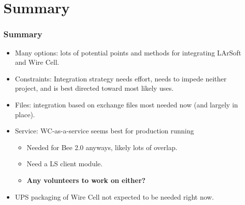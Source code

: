 \documentclass[xcolor=dvipsnames]{beamer}
\begin{document}
\section{Summary}

\begin{frame}
\end{frame}

\begin{frame}
  \frametitle{Summary}
  \begin{itemize}
  \item Many options: lots of potential points and methods for integrating LArSoft and Wire Cell.
  \item Constraints: Integration strategy needs effort, needs
    to impede neither project, and is best directed toward most likely uses.
  \item Files: integration based on exchange files most needed now (and largely in place).
  \item Service: WC-as-a-service seems best for production running
    \begin{itemize}
    \item Needed for Bee 2.0 anyways, likely lots of overlap.
    \item Need a LS client module.
    \item \textbf{Any volunteers to work on either?}
    \end{itemize}
  \item UPS packaging of Wire Cell not expected to be needed right now.
  \end{itemize}
\end{frame}
\end{document}
